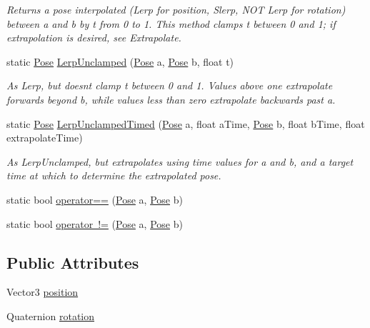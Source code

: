 \begin{DoxyCompactItemize}
\begin{DoxyCompactList}\small\item\em Returns a pose interpolated (Lerp for position, Slerp, N\+OT Lerp for rotation) between a and b by t from 0 to 1. This method clamps t between 0 and 1; if extrapolation is desired, see Extrapolate. \end{DoxyCompactList}\item 
static \mbox{\hyperlink{struct_leap_1_1_unity_1_1_pose}{Pose}} \mbox{\hyperlink{struct_leap_1_1_unity_1_1_pose_a4a16c9cf3281db86bdb0160d80b4cf3a}{Lerp\+Unclamped}} (\mbox{\hyperlink{struct_leap_1_1_unity_1_1_pose}{Pose}} a, \mbox{\hyperlink{struct_leap_1_1_unity_1_1_pose}{Pose}} b, float t)
\begin{DoxyCompactList}\small\item\em As Lerp, but doesn\textquotesingle{}t clamp t between 0 and 1. Values above one extrapolate forwards beyond b, while values less than zero extrapolate backwards past a. \end{DoxyCompactList}\item 
static \mbox{\hyperlink{struct_leap_1_1_unity_1_1_pose}{Pose}} \mbox{\hyperlink{struct_leap_1_1_unity_1_1_pose_a2d4f86a6cbde7e36020570737e7cb4b2}{Lerp\+Unclamped\+Timed}} (\mbox{\hyperlink{struct_leap_1_1_unity_1_1_pose}{Pose}} a, float a\+Time, \mbox{\hyperlink{struct_leap_1_1_unity_1_1_pose}{Pose}} b, float b\+Time, float extrapolate\+Time)
\begin{DoxyCompactList}\small\item\em As Lerp\+Unclamped, but extrapolates using time values for a and b, and a target time at which to determine the extrapolated pose. \end{DoxyCompactList}\item 
static bool \mbox{\hyperlink{struct_leap_1_1_unity_1_1_pose_a0f9beeec0e5acd83e1405ba0915a563f}{operator==}} (\mbox{\hyperlink{struct_leap_1_1_unity_1_1_pose}{Pose}} a, \mbox{\hyperlink{struct_leap_1_1_unity_1_1_pose}{Pose}} b)
\item 
static bool \mbox{\hyperlink{struct_leap_1_1_unity_1_1_pose_a5eb039dbc9e70537da843e3eb92adcb4}{operator !=}} (\mbox{\hyperlink{struct_leap_1_1_unity_1_1_pose}{Pose}} a, \mbox{\hyperlink{struct_leap_1_1_unity_1_1_pose}{Pose}} b)
\end{DoxyCompactItemize}
\subsection*{Public Attributes}
\begin{DoxyCompactItemize}
\item 
Vector3 \mbox{\hyperlink{struct_leap_1_1_unity_1_1_pose_ad90ba514c97484e10d747d9bdf9b81a9}{position}}
\item 
Quaternion \mbox{\hyperlink{struct_leap_1_1_unity_1_1_pose_a59e70598d0ebe38d79a55b88b51734ad}{rotation}}
\end{DoxyCompactItemize}
